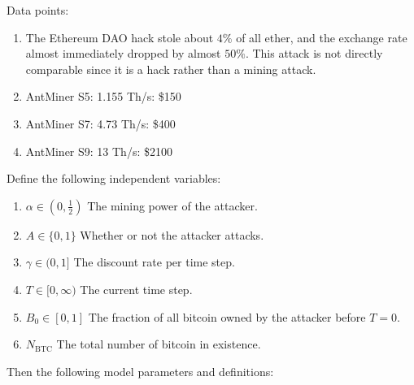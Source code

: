 \documentclass[12pt]{article}
\newcommand*{\Attack}{A}
\newcommand*{\Time}{T}
\newcommand*{\ABtcOrig}{{B_0}}
\newcommand*{\NumBtc}{{N_{\mathrm{BTC}}}}
\newenvironment{defs}
  { \begin{enumerate}[labelindent=0pt,labelwidth=2.5in,itemindent=0em,align=parleft,leftmargin=!] }
  { \end{enumerate} }
\begin{document}
Data points:

\begin{enumerate}
  \item
    The Ethereum DAO hack stole about $4\%$ of all ether, and the exchange rate
    almost immediately dropped by almost $50\%$.
    This attack is not directly comparable since it is a hack rather than a
    mining attack.
  \item
    AntMiner S5: 1.155 Th/s: \$150
  \item
    AntMiner S7: 4.73 Th/s: \$400
  \item
    AntMiner S9: 13 Th/s: \$2100
\end{enumerate}

Define the following independent variables:

\begin{defs}
  \item[{$\alpha \in (0, \frac{1}{2})$}]
    The mining power of the attacker.
  \item[{$\Attack \in \{0, 1\}$}]
    Whether or not the attacker attacks.
  \item[{$\gamma \in (0, 1]$}]
    The discount rate per time step.
  \item[{$\Time \in [0, \infty)$}]
    The current time step.
  \item[{$\ABtcOrig \in [0, 1]$}]
    The fraction of all bitcoin owned by the attacker before $T = 0$.
  \item[{$\NumBtc$}]
    The total number of bitcoin in existence.
\end{defs}

Then the following model parameters and definitions:
\end{document}
